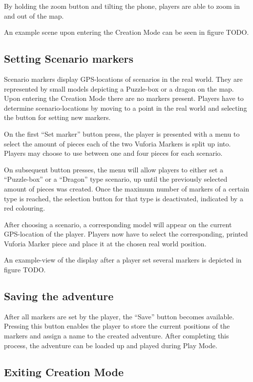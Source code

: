 \documentclass{sigchi-ext}
\begin{document}
By holding the zoom button and tilting the phone, players are able to zoom in and out of the map.

An example scene upon entering the Creation Mode can be seen in figure TODO.

\subsection{Setting Scenario markers}

Scenario markers display GPS-locations of scenarios in the real world. They are represented by small models depicting a Puzzle-box or a dragon on the map. Upon entering the Creation Mode there are no markers present. Players have to determine scenario-locations by moving to a point in the real world and selecting the button for setting new markers.

On the first ``Set marker'' button press, the player is presented with a menu to select the amount of pieces each of the two Vuforia Markers is split up into. Players may choose to use between one and four pieces for each scenario.

On subsequent button presses, the menu will allow players to either set a ``Puzzle-box'' or a ``Dragon'' type scenario, up until the previously selected amount of pieces was created. Once the maximum number of markers of a certain type is reached, the selection button for that type is deactivated, indicated by a red colouring.

After choosing a scenario, a corresponding model will appear on the current GPS-location of the player. Players now have to select the corresponding, printed Vuforia Marker piece and place it at the chosen real world position.

An example-view of the display after a player set several markers is depicted in figure TODO.

\subsection{Saving the adventure}

After all markers are set by the player, the ``Save'' button becomes available. Pressing this button enables the player to store the current positions of the markers and assign a name to the created adventure. After completing this process, the adventure can be loaded up and played during Play Mode.

\subsection{Exiting Creation Mode}
\end{document}
